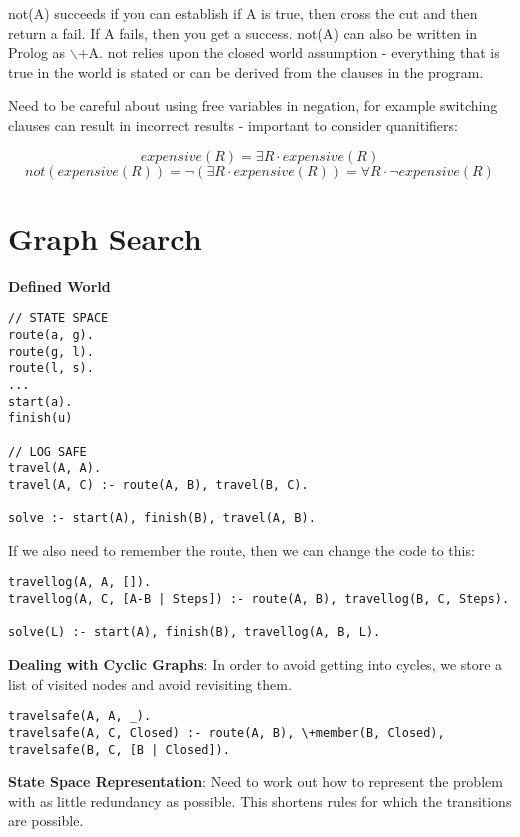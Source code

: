 \documentclass{article}
\begin{document}
not(A) succeeds if you can establish if A is true, then cross the cut and then return a fail. If A fails, then you get a success. not(A) can also be written in Prolog as $\backslash$+A. not relies upon the closed world assumption - everything that is true in the world is stated or can be derived from the clauses in the program.

Need to be careful about using free variables in negation, for example switching clauses can result in incorrect results - important to consider quanitifiers:

\begin{equation}\label{eq1}
expensive(R) = \exists R \cdot expensive(R)
\end{equation}
\begin{equation}\label{eq2}
not(expensive(R)) = \neg (\exists R \cdot expensive(R)) = \forall R \cdot \neg expensive(R)
\end{equation}

\section{Graph Search}
\noindent
\textbf{Defined World}
\begin{lstlisting}
// STATE SPACE
route(a, g).
route(g, l).
route(l, s).
...
start(a).
finish(u)

// LOG SAFE
travel(A, A).
travel(A, C) :- route(A, B), travel(B, C).

solve :- start(A), finish(B), travel(A, B).
\end{lstlisting}

\bigskip
\noindent
If we also need to remember the route, then we can change the code to this:

\begin{lstlisting}
travellog(A, A, []).
travellog(A, C, [A-B | Steps]) :- route(A, B), travellog(B, C, Steps).

solve(L) :- start(A), finish(B), travellog(A, B, L).
\end{lstlisting}

\bigskip
\noindent
\textbf{Dealing with Cyclic Graphs}: In order to avoid getting into cycles, we store a list of visited nodes and avoid revisiting them.

\begin{lstlisting}
travelsafe(A, A, _).
travelsafe(A, C, Closed) :- route(A, B), \+member(B, Closed), travelsafe(B, C, [B | Closed]).
\end{lstlisting}

\bigskip
\noindent
\textbf{State Space Representation}: Need to work out how to represent the problem with as little redundancy as possible. This shortens rules for which the transitions are possible.
\end{document}
